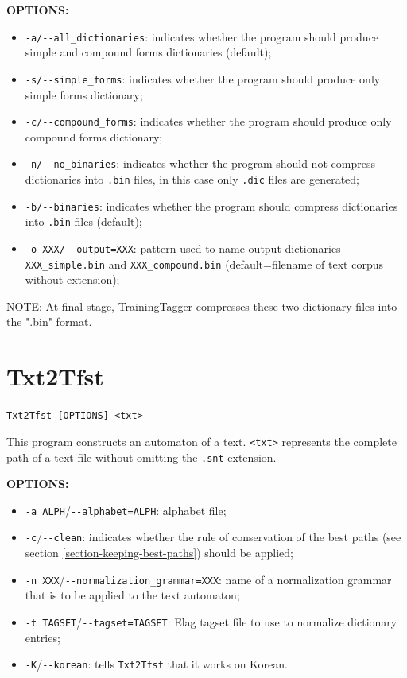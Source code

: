 \bigskip
\noindent \textbf{OPTIONS:}
\begin{itemize}
  \item \verb+-a/--all_dictionaries+: indicates whether the program should produce simple and compound forms
  dictionaries (default);
  \item \verb+-s/--simple_forms+: indicates whether the program should produce only simple forms
  dictionary;
  \item \verb+-c/--compound_forms+: indicates whether the program should produce only compound forms
  dictionary;
  \item \verb+-n/--no_binaries+: indicates whether the program should not compress dictionaries into 
  \verb+.bin+ files, in this case only \verb+.dic+ files are generated;
  \item \verb+-b/--binaries+: indicates whether the program should compress dictionaries into 
  \verb+.bin+ files (default);
  \item \verb+-o XXX/--output=XXX+: pattern used to name output dictionaries \verb+XXX_simple.bin+
  and \verb+XXX_compound.bin+ (default=filename of text corpus without extension);
\end{itemize}

\bigskip
\noindent NOTE: At final stage, TrainingTagger compresses these two dictionary files into the ".bin" format.


\section{Txt2Tfst} \verb+Txt2Tfst [OPTIONS] <txt>+

\bigskip
\noindent This program constructs an automaton of a text. \verb+<txt>+
represents the complete path of a text file without omitting the \verb+.snt+
extension.

\bigskip
\noindent \textbf{OPTIONS:}
\begin{itemize}
  \item \verb+-a ALPH+/\verb+--alphabet=ALPH+: alphabet file;
  
  \item \verb+-c+/\verb+--clean+: indicates whether the rule of conservation of 
  the best paths (see section \ref{section-keeping-best-paths}) 
  should be applied;
  
  \item \verb+-n XXX+/\verb+--normalization_grammar=XXX+: name of a normalization 
  grammar that is to be applied to the text automaton; 
  \item \verb+-t TAGSET+/\verb+--tagset=TAGSET+: Elag tagset file to use to
  normalize dictionary entries;
  \item \verb+-K+/\verb+--korean+: tells \verb+Txt2Tfst+ that it works on
  Korean.
\end{itemize}

